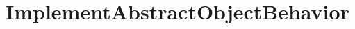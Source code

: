 \section{ImplementAbstractObjectBehavior}
\label{feature:ImplementAbstractObjectBehavior}
\ClearAPI
\TODO